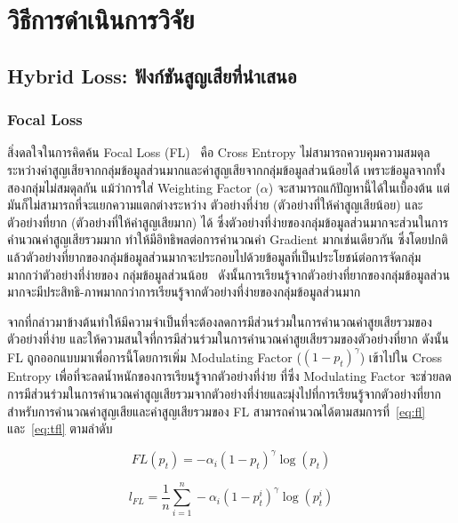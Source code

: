 \chapter{วิธีการดำเนินการวิจัย}
\label{chapter:experiment}

\section{Hybrid Loss: ฟังก์ชันสูญเสียที่นำเสนอ}
\subsection{Focal Loss}
สิ่งดลใจในการคิดค้น Focal Loss (FL)~\cite{Lin:2017} คือ Cross Entropy ไม่สามารถควบคุมความสมดุลระหว่างค่าสูญเสียจากกลุ่มข้อมูลส่วนมากและค่าสูญเสียจากกลุ่มข้อมูลส่วนน้อยได้ เพราะข้อมูลจากทั้งสองกลุ่มไม่สมดุลกัน แม้ว่าการใส่ Weighting Factor ($\alpha$) จะสามารถแก้ปัญหานี้ได้ในเบื้องต้น แต่มันก็ไม่สามารถที่จะแยกความแตกต่างระหว่าง ตัวอย่างที่ง่าย (ตัวอย่างที่ให้ค่าสูญเสียน้อย) และ ตัวอย่างที่ยาก (ตัวอย่างที่ให้ค่าสูญเสียมาก) ได้ ซึ่งตัวอย่างที่ง่ายของกลุ่มข้อมูลส่วนมากจะส่วนในการคำนวณค่าสูญเสียรวมมาก ทำให้มีอิทธิพลต่อการคำนวณค่า Gradient มากเช่นเดียวกัน ซึ่งโดยปกติแล้วตัวอย่างที่ยากของกลุ่มข้อมูลส่วนมากจะประกอบไปด้วยข้อมูลที่เป็นประโยชน์ต่อการจัดกลุ่มมากกว่าตัวอย่างที่ง่ายของ
กลุ่มข้อมูลส่วนน้อย~\cite{Zhu:2019} ดังนั้นการเรียนรู้จากตัวอย่างที่ยากของกลุ่มข้อมูลส่วนมากจะมีประสิทธิ\hyp{}ภาพมากกว่าการเรียนรู้จากตัวอย่างที่ง่ายของกลุ่มข้อมูลส่วนมาก

จากที่กล่าวมาข้างต้นทำให้มีความจำเป็นที่จะต้องลดการมีส่วนร่วมในการคำนวณค่าสูยเสียรวมของตัวอย่างที่ง่าย และให้ความสนใจที่การมีส่วนร่วมในการคำนวณค่าสูยเสียรวมของตัวอย่างที่ยาก ดังนั้น FL ถูกออกแบบมาเพื่อการนี้โดยการเพิ่ม Modulating Factor ($(1 - p_{t})^{\gamma}$) เข้าไปใน Cross Entropy เพื่อที่จะลดน้ำหนักของการเรียนรู้จากตัวอย่างที่ง่าย ที่ซึ่ง Modulating Factor จะช่วยลดการมีส่วนร่วมในการคำนวณค่าสูญเสียรวมจากตัวอย่างที่ง่ายและมุ่งไปที่การเรียนรู้จากตัวอย่างที่ยาก สำหรับการคำนวณค่าสูญเสียและค่าสูญเสียรวมของ FL สามารถคำนวณได้ตามสมการที่~\ref{eq:fl} และ~\ref{eq:tfl} ตามลำดับ

\begin{equation} \label{eq:fl}
FL(p_{t}) = - \alpha_{i}(1 - p_{t})^\gamma \log (p_{t})
\end{equation}

\begin{equation} \label{eq:tfl}
    l_{FL} = \frac{1}{n} \sum_{i = 1}^{n} -\alpha_{i}(1 - p_{t}^{i})^{\gamma}\log (p_{t}^{i})
\end{equation}

